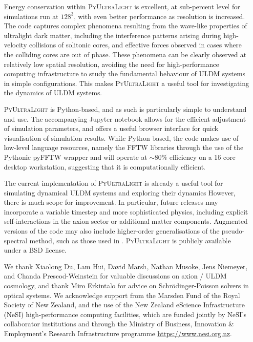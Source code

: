 \documentclass[a4paper,11pt]{article}
\newcommand{\PyUltraLight}{\textsc{PyUltraLight}\xspace}
\begin{document}
Energy conservation within \PyUltraLight is excellent, at sub-percent level for simulations run at $128^3$, with even better performance as resolution is increased. The code captures complex phenomena resulting from the wave-like properties of ultralight dark matter, including the interference patterns arising during high-velocity collisions of solitonic cores, and  effective forces observed in cases where the colliding cores are out of phase. These phenomena can be clearly observed at relatively low spatial resolution, avoiding the need for high-performance computing infrastructure to study the fundamental behaviour of ULDM systems in simple configurations. This makes \PyUltraLight a useful tool for investigating the  dynamics of ULDM systems. 

\PyUltraLight is Python-based, and as such is particularly simple to understand and use. The accompanying Jupyter notebook allows for the efficient adjustment of simulation parameters, and offers a useful browser interface for quick visualisation of simulation results. While Python-based, the code makes use of low-level language resources, namely the FFTW libraries through the use of the Pythonic pyFFTW wrapper and will operate at $\sim 80\%$ efficiency on a 16 core desktop workstation, suggesting that it is computationally efficient. 

The current implementation of \PyUltraLight is already a useful tool for simulating dynamical ULDM systems and exploring their dynamics However, there is much scope for  improvement. In particular, future releases may incorporate a variable timestep and more sophisticated physics, including explicit self-interactions in the axion sector or additional matter components. Augmented versions of the code may also include higher-order generalisations of the pseudo-spectral method, such as those used in \cite{Levkov:2018kau}. \PyUltraLight is publicly available under a BSD license. 

\acknowledgments

We thank Xiaolong Du, Lam Hui, David Marsh, Nathan Musoke, Jens Niemeyer, and Chanda Prescod-Weinstein for valuable discussions on axion / ULDM cosmology, and thank Miro Erkintalo for advice on Schr{\"o}dinger-Poisson solvers  in optical systems.  We acknowledge support from the Marsden Fund of the Royal Society of New Zealand, and  the use of the New Zealand eScience Infrastructure (NeSI) high-performance computing facilities, which are funded jointly by NeSI's collaborator institutions and through the Ministry of Business, Innovation \& Employment's Research Infrastructure programme \url{https://www.nesi.org.nz}. 
\end{document}
